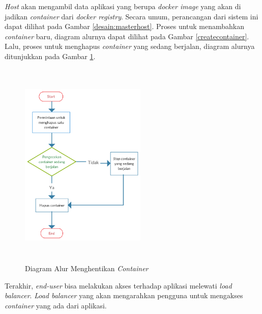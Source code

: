             \indent \textit{Host} akan mengambil data aplikasi yang berupa \textit{docker image} yang akan di jadikan \textit{container} dari \textit{docker registry}. Secara umum, perancangan dari sistem ini dapat dilihat pada Gambar \ref{desain:masterhost}. Proses untuk menambahkan \textit{container} baru, diagram alurnya dapat dilihat pada Gambar \ref{createcontainer}. Lalu, proses untuk menghapus \textit{container} yang sedang berjalan, diagram alurnya ditunjukkan pada Gambar \ref{deletecontainer}.
            \begin{figure}[H]
				\centering
				\includegraphics[width=6cm,height=10cm]{Images/C-3/deletecontainer.png}
				\caption{Diagram Alur Menghentikan \textit{Container}}
				\label{deletecontainer}
			\end{figure}
            \indent Terakhir, \textit{end-user} bisa melakukan akses terhadap aplikasi melewati \textit{load balancer}. \textit{Load balancer} yang akan mengarahkan pengguna untuk mengakses \textit{container} yang ada dari aplikasi.            
            
